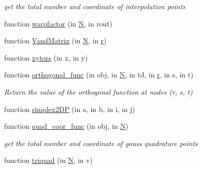 \begin{DoxyCompactItemize}
\begin{DoxyCompactList}\small\item\em get the total number and coordinate of interpolation points \end{DoxyCompactList}\item 
function \hyperlink{class_std_tri_a0f1c1dd1fb84947d93e7f903703a7fdc}{warpfactor} (in \hyperlink{class_std_cell_a8df35ad5169af36d3dff62644f7878c9}{N}, in rout)
\item 
function \hyperlink{class_std_tri_a1fe29f7a8efdf896b62800b4debb2861}{Vand\+Matrix} (in \hyperlink{class_std_cell_a8df35ad5169af36d3dff62644f7878c9}{N}, in \hyperlink{class_std_cell_a737dd2feb25f74be0215a594334ec622}{r})
\item 
function \hyperlink{class_std_tri_ab8660f3946e2da58dbfe44f81b3daec6}{xytors} (in x, in y)
\item 
function \hyperlink{class_std_tri_a4c70bb498141c7aef753369b5ec973b1}{orthogonal\+\_\+func} (in obj, in \hyperlink{class_std_cell_a8df35ad5169af36d3dff62644f7878c9}{N}, in td, in \hyperlink{class_std_cell_a737dd2feb25f74be0215a594334ec622}{r}, in s, in t)
\begin{DoxyCompactList}\small\item\em Return the value of the orthogonal function at nodes (r, s, t) \end{DoxyCompactList}\item 
function \hyperlink{class_std_tri_a2124f216e18511e4236c6164c954ce38}{simplex2\+DP} (in a, in b, in i, in j)
\item 
function \hyperlink{class_std_tri_a1a5987df9b0f25bd25232700871a3834}{quad\+\_\+coor\+\_\+func} (in obj, in \hyperlink{class_std_cell_a8df35ad5169af36d3dff62644f7878c9}{N})
\begin{DoxyCompactList}\small\item\em get the total number and coordinate of gauss quadrature points \end{DoxyCompactList}\item 
function \hyperlink{class_std_tri_a771554109d9cc7c0590187e90cfa4d49}{triquad} (in \hyperlink{class_std_cell_a8df35ad5169af36d3dff62644f7878c9}{N}, in v)
\end{DoxyCompactItemize}
